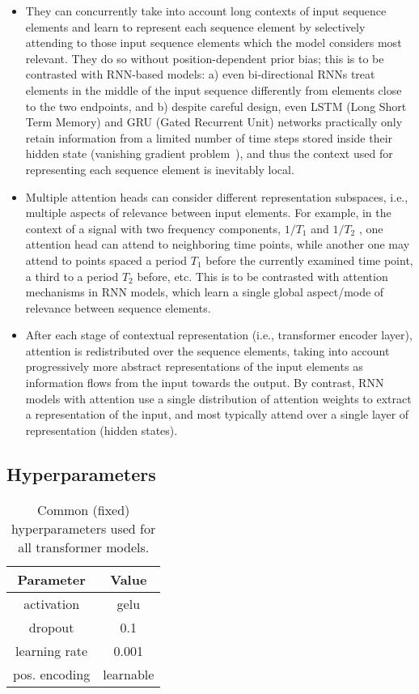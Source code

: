\documentclass{article} \usepackage{iclr2021_conference,times}
\begin{document}
\begin{itemize}
    \item They can concurrently take into account long contexts of input sequence elements and learn to represent each sequence element by selectively attending to those input sequence elements which the model considers most relevant. They do so without position-dependent prior bias; this is to be contrasted with RNN-based models: a) even bi-directional RNNs treat elements in the middle of the input sequence differently from elements close to the two endpoints, and b) despite careful design, even LSTM (Long Short Term Memory) and GRU (Gated Recurrent Unit) networks practically only retain information from a limited number of time steps stored inside their hidden state (vanishing gradient problem~\citep{hochreiter_vanishing_1998, pascanu_difficulty_2013}), and thus the context used for representing each sequence element is inevitably local.
    
    \item Multiple attention heads can consider different representation subspaces, i.e., multiple aspects of relevance between input elements. For example, in the context of a signal with two frequency components, $1/T_1$ and $1/T_2$ , one attention head can attend to neighboring time points, while another one may attend to points spaced a period $T_1$ before the currently examined time point, a third to a period $T_2$ before, etc. This is to be contrasted with attention mechanisms in RNN models, which learn a single global aspect/mode of relevance between sequence elements.
    
    \item After each stage of contextual representation (i.e., transformer encoder layer), attention is redistributed over the sequence elements, taking into account progressively more abstract representations of the input elements as information flows from the input towards the output. By contrast, RNN models with attention use a single distribution of attention weights to extract a representation of the input, and most typically attend over a single layer of representation (hidden states).

\end{itemize}

\subsection{Hyperparameters}

\begin{table}
\centering
\begin{tabular}{|c|c|} 
\hline
\textbf{Parameter}   & \textbf{Value}  \\ 
\hline
activation       & gelu            \\
dropout          & 0.1             \\
learning rate               & 0.001           \\
pos. encoding    & learnable       \\
\hline
\end{tabular}
\caption{Common (fixed) hyperparameters used for all transformer models.}
\label{basic_config}
\end{table}
\end{document}
